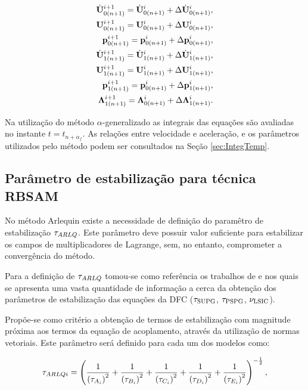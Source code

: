 \documentclass[tese_patricia]{subfiles}
\begin{document}
\begin{align}
	\dot{\mathbf{U}}_{0(n+1)}^{i+1} = \dot{\mathbf{U}}_{0(n+1)}^{i} + \Delta\dot{\mathbf{U}}_{0(n+1)}^{i}, \label{eq:up1} \\ 
	\mathbf{U}_{0(n+1)}^{i+1} = \mathbf{U}_{0(n+1)}^{i} + \Delta\mathbf{U}_{0(n+1)}^{i},\label{eq:up2}\\
	\mathbf{p}_{0(n+1)}^{i+1} = \mathbf{p}_{0(n+1)}^{i} + \Delta\mathbf{p}_{0(n+1)}^{i}, \label{eq:up3} \\
	\dot{\mathbf{U}}_{1(n+1)}^{i+1} = \dot{\mathbf{U}}_{1(n+1)}^{i} + \Delta\dot{\mathbf{U}}_{1(n+1)}^{i}, \label{eq:up4} \\ 
	\mathbf{U}_{1(n+1)}^{i+1} = \mathbf{U}_{1(n+1)}^{i} + \Delta\mathbf{U}_{1(n+1)}^{i},\label{eq:up5}\\
	\mathbf{p}_{1(n+1)}^{i+1} = \mathbf{p}_{0(n+1)}^{i} + \Delta\mathbf{p}_{1(n+1)}^{i}, \label{eq:up6} \\
	\boldsymbol{\Lambda}_{1(n+1)}^{i+1} = \boldsymbol{\Lambda}_{0(n+1)}^{i} + \Delta\boldsymbol{\Lambda}_{1(n+1)}^{i}. \label{eq:up7}
\end{align}

Na utilização do método $\alpha$-generalizado as integrais das equações são avaliadas no instante $t = t_{n+\alpha_{f}}$. As relações entre velocidade e aceleração, e os parâmetros utilizados pelo método podem ser consultados na Seção \ref{sec:IntegTemp}.


\subsection{Parâmetro de estabilização para técnica RBSAM}

No método Arlequin existe a necessidade de definição do paramêtro de estabilização $\tau_{ARLQ}$. Este parâmetro deve possuir valor suficiente para estabilizar os campos de multiplicadores de Lagrange, sem, no entanto, comprometer a convergência do método. 

Para a definição de $\tau_{ARLQ}$ tomou-se como referência os trabalhos de  e  nos quais se apresenta uma vasta quantidade de informação a cerca da obtenção dos parâmetros de estabilização das equações da DFC ($\tau_{\mathrm{SUPG}}$, $\tau_{\mathrm{PSPG}}$, $\nu_{\mathrm{LSIC}}$). 
 
Propõe-se como critério a obtenção de termos de estabilização com magnitude próxima aos termos da equação de acoplamento, através da utilização de normas vetoriais. Este parâmetro será definido para cada um dos modelos como:

\begin{align}
	\tau_{ARLQi} = \left(\frac{1}{\left(\tau_{A_i}\right)^{2}} + \frac{1}{\left(\tau_{B_i}\right)^{2}} +  \frac{1}{\left(\tau_{C_i}\right)^{2}} + 
	\frac{1}{\left(\tau_{D_i}\right)^{2}} +
	\frac{1}{\left(\tau_{E_i}\right)^{2}}
	\right)^{-\frac{1}{2}},
\end{align}
\end{document}

